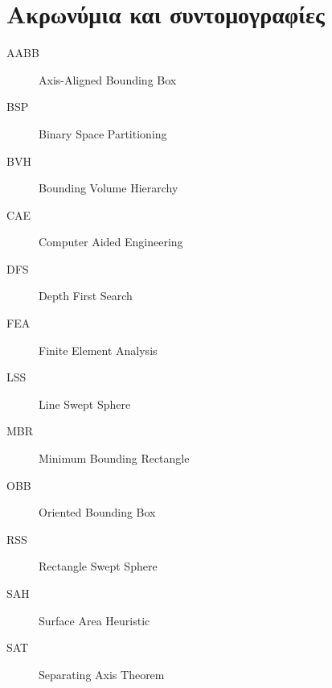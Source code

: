 \chapter{Ακρωνύμια και συντομογραφίες}

\begin{description}
  \item[AABB] Axis-Aligned Bounding Box
  \item[BSP] Binary Space Partitioning
  \item[BVH] Bounding Volume Hierarchy
  \item[CAE] Computer Aided Engineering
  \item[DFS] Depth First Search
  \item[FEA] Finite Element Analysis
  \item[LSS] Line Swept Sphere
  \item[MBR] Minimum Bounding Rectangle
  \item[OBB] Oriented Bounding Box
  \item[RSS] Rectangle Swept Sphere 
  \item[SAH] Surface Area Heuristic
  \item[SAT] Separating Axis Theorem 
\end{description}
